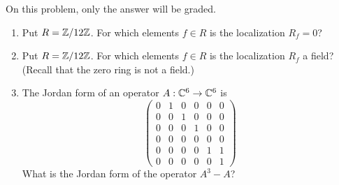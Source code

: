 \begin{question}[subtitle = August 2021 Problem 1,ID=Aug21_1]
On this problem, only the answer will be graded.
\begin{enumerate}
    \item Put $R=\mathbb{Z}/12\mathbb{Z}$. For which elements $f\in R$ is the localization $R_f= 0$?
    \item Put $R=\mathbb{Z}/12\mathbb{Z}$. For which elements $f\in R$ is the localization $R_f$ a field? (Recall that the zero ring is not a field.)
    \item The Jordan form of an operator $A:\mathbb{C}^6\to \mathbb{C}^6$ is
    \[
    \begin{pmatrix}
    0 & 1 & 0 & 0 & 0 & 0\\
    0 & 0 & 1 & 0 & 0 & 0\\
    0 & 0 & 0 & 1 & 0 & 0\\
    0 & 0 & 0 & 0 & 0 & 0\\
    0 & 0 & 0 & 0 & 1 & 1\\
    0 & 0 & 0 & 0 & 0 & 1
    \end{pmatrix}
    \]
    What is the Jordan form of the operator $A^3-A$?
\end{enumerate}
\end{question}
